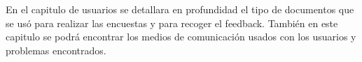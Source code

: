 En el capitulo de usuarios se detallara en profundidad el tipo de documentos que se usó para realizar las encuestas y para recoger el feedback. También en este capitulo se podrá encontrar los medios de comunicación usados con los usuarios y problemas encontrados.
\nocite{*}






















